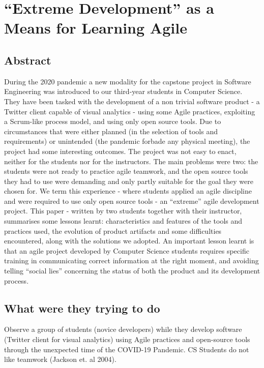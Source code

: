 
\section{“Extreme Development” as a Means for Learning Agile}

\subsection{Abstract}

During the 2020 pandemic a new modality for the capstone project in Software Engineering was introduced to our third-year students in Computer Science. They have been tasked with the development of a non trivial software product - a Twitter client capable of visual analytics - using some Agile practices, exploiting a Scrum-like process model, and using only open source tools. Due to circumstances that were either planned (in the selection of tools and requirements) or unintended (the pandemic forbade any physical meeting), the project had some interesting outcomes. The project was not easy to enact, neither for the students nor for the instructors. The main problems were two: the students were not ready to practice agile teamwork, and the open source tools they had to use were demanding and only partly suitable for the goal they were chosen for. We term this experience - where students applied an agile discipline and were required to use only open source tools - an “extreme” agile development project. This paper - written by two students together with their instructor, summarises some lessons learnt: characteristics and features of the tools and practices used, the evolution of product artifacts and some difficulties encountered, along with the solutions we adopted. An important lesson learnt is that an agile project developed by Computer Science students requires specific training in communicating correct information at the right moment, and avoiding telling “social lies” concerning the status of both the product and its development process.

\subsection{What were they trying to do}

Observe a group of students (novice developers) while they develop software (Twitter client for visual analytics) using Agile practices and open-source tools through the unexpected time of the COVID-19 Pandemic. CS Students do not like teamwork (Jackson et. al 2004).

